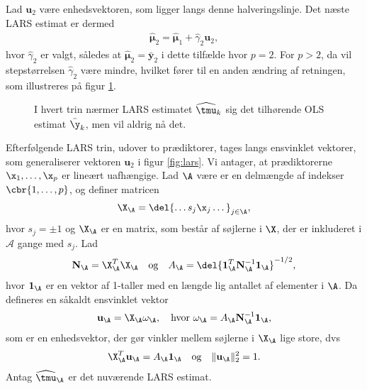 %
Lad $\mathbf{u}_2$ være enhedsvektoren, som ligger langs denne halveringslinje.
Det næste LARS estimat er dermed
\begin{align*}
\widehat{\boldsymbol{\mu}}_2 = \widehat{\boldsymbol{\mu}}_1+ \widehat{\gamma}_2 \mathbf{u}_2,
\end{align*}
hvor $\widehat{\gamma}_2$ er valgt, således at $\widehat{\boldsymbol{\mu}}_2 = \bar{\textbf{y}}_2$ i dette tilfælde hvor $p = 2$. 
For \(p>2\), da vil stepstørrelsen \(\widehat{\gamma}_2\) være mindre, hvilket fører til en anden ændring af retningen, som illustreres på figur \ref{fig:lars2}.
%
\begin{figure}[H]
\centering
\scalebox{0.8}{}
\caption{I hvert trin nærmer LARS estimatet \(\widehat{\tmu}_k\) sig det tilhørende OLS estimat \(\bar{\y}_k\), men vil aldrig nå det.
 }\label{fig:lars2}
\end{figure}
%
Efterfølgende LARS trin, udover to prædiktorer, tages langs ensvinklet vektorer, som generaliserer vektoren \(\mathbf{u}_2\) i figur \ref{fig:lars}.
Vi antager, at prædiktorerne \(\x_1, \ldots, \x_p\) er lineært uafhængige.
Lad \(\A\) være er en delmængde af indekser \(\cbr{1,\ldots, p}\), og definer matricen
\begin{align}
\X_\A = \del{\dots s_j \x_j \dots}_{j \in \A}, \label{eq:lars_2.4}
\end{align}
hvor $s_j = \pm 1$ og \(\X_\A\) er en matrix, som består af søjlerne i \(\X\), der er inkluderet i \(\mathcal{A}\) gange med \(s_j\).
Lad 
\begin{align}
\mathbf{N}_\A = \X_\A^T \X_\A \quad \text{og} \quad A_\A = \del{\mathbf{1}_\A^T \mathbf{N}_\A^{-1} \mathbf{1}_\A}^{-1/2}, \label{eq:lars_2.5}
\end{align}
hvor \(\mathbf{1}_\A\) er en vektor af 1-taller med en længde lig antallet af elementer i \(\A\).
Da defineres en såkaldt ensvinklet vektor
\begin{align}
\mathbf{u}_\A = \X_\A \omega_\A, \quad \text{hvor } \omega_\A = A_\A \mathbf{N}_\A^{-1} \mathbf{1}_\A, \label{eq:lars_2.6}
\end{align}
som er en enhedsvektor, der gør vinkler mellem søjlerne i \(\X_\A\) lige store, dvs
\begin{align}
\X_\A^T \mathbf{u}_\A = A_\A \mathbf{1}_\A \quad \text{og} \quad \Vert \mathbf{u}_\A \Vert_2^2 = 1. \label{eq:lars_2.7}
\end{align}
Antag \(\widehat{\tmu}_\A\) er det nuværende LARS estimat.
